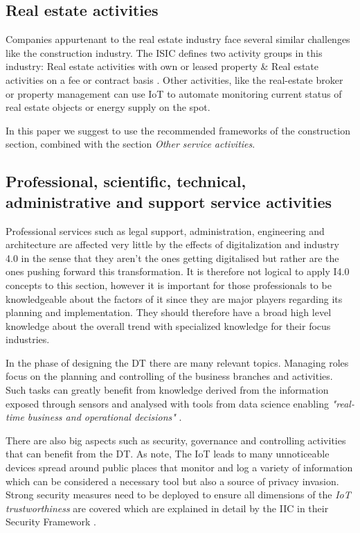 \subsection{Real estate activities}

Companies appurtenant to the real estate industry face several similar challenges like the construction industry.
The \ac{ISIC} defines two activity groups in this industry: Real estate activities with own or leased property \& Real estate activities on a fee or contract basis \cite{ISIC:2008}. Other activities, like the real-estate broker or property management can use \ac{IoT} to automate monitoring current status of real estate objects or energy supply on the spot. 

In this paper we suggest to use the recommended frameworks of the construction section, combined with the section \emph{Other service activities}. 

\subsection{Professional, scientific, technical, administrative and support service activities}
\label{subsec:profscience}


Professional services such as legal support, administration, engineering and architecture are affected very little by the effects of digitalization and industry 4.0 in the sense that they aren't the ones getting digitalised but rather are the ones pushing forward this transformation. It is therefore not logical to apply \ac{I4.0} concepts to this section, however it is important for those professionals to be knowledgeable about the factors of it since they are major players regarding its planning and implementation. They should therefore have a broad high level knowledge about the overall trend with specialized knowledge for their focus industries.

In the phase of designing the \ac{DT} there are many relevant topics. Managing roles focus on the planning and controlling of the business branches and activities. Such tasks can greatly benefit from knowledge derived from the information exposed through sensors and analysed with tools from data science enabling \emph{"real-time business and operational decisions"} \cite[p.84]{iicarchitecture:2016}.

There are also big aspects such as security, governance and controlling activities that can benefit from the \ac{DT}. As \citeauthor{Tragos2016trusted} note, The \ac{IoT} leads to many unnoticeable devices spread around public places that monitor and log a variety of information which can be considered a necessary tool but also a source of privacy invasion. Strong security measures need to be deployed to ensure all dimensions of the \emph{\ac{IoT} trustworthiness} are covered which are explained in detail by the \ac{IIC} in their Security Framework \cite{iicsecurity:2016}.

